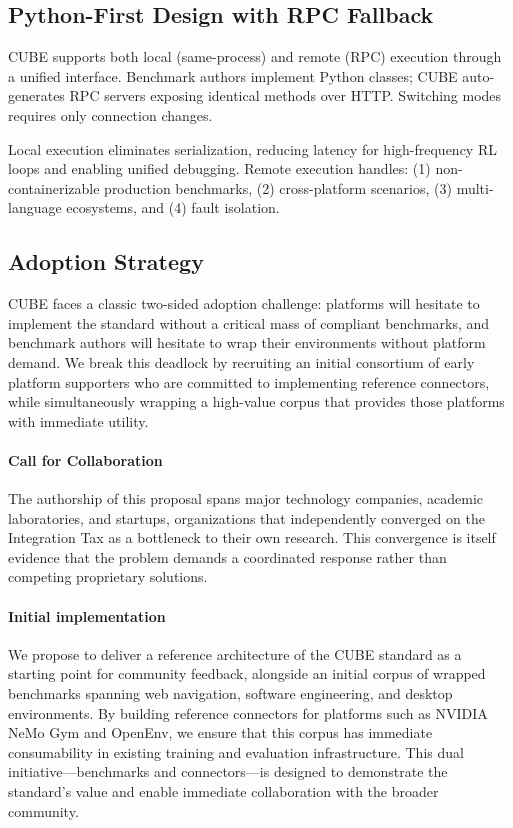 \documentclass{article}
\theoremstyle{plain}
\theoremstyle{definition}
\theoremstyle{remark}
\begin{document}
\subsection{Python-First Design with RPC Fallback}
\label{sec:python_first}

CUBE supports both local (same-process) and remote (RPC) execution through a unified interface. Benchmark authors implement Python classes; CUBE auto-generates RPC servers exposing identical methods over HTTP. Switching modes requires only connection changes.

Local execution eliminates serialization, reducing latency for high-frequency RL loops and enabling unified debugging. Remote execution handles: (1) non-containerizable production benchmarks, (2) cross-platform scenarios, (3) multi-language ecosystems, and (4) fault isolation.


\subsection{Adoption Strategy}
\label{sec:adoption}

CUBE faces a classic two-sided adoption challenge: platforms will hesitate to implement the standard without a critical mass of compliant benchmarks, and benchmark authors will hesitate to wrap their environments without platform demand. We break this deadlock by recruiting an initial consortium of early platform supporters who are committed to implementing reference connectors, while simultaneously wrapping a high-value corpus that provides those platforms with immediate utility. 

\paragraph{Call for Collaboration}
The authorship of this proposal spans major technology companies, academic laboratories, and startups, organizations that independently converged on the Integration Tax as a bottleneck to their own research. This convergence is itself evidence that the problem demands a coordinated response rather than competing proprietary solutions.

\paragraph{Initial implementation}
We propose to deliver a reference architecture of the CUBE standard as a starting point for community feedback, alongside an initial corpus of wrapped benchmarks spanning web navigation, software engineering, and desktop environments. By building reference connectors for platforms such as NVIDIA NeMo Gym and OpenEnv, we ensure that this corpus has immediate consumability in existing training and evaluation infrastructure. This dual initiative—benchmarks and connectors—is designed to demonstrate the standard's value and enable immediate collaboration with the broader community.
\end{document}
